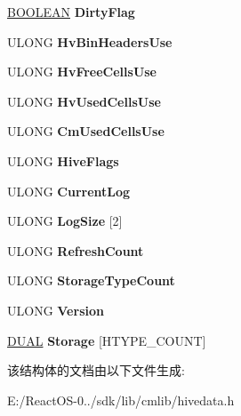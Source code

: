 \begin{DoxyCompactItemize}
\hyperlink{_processor_bind_8h_a112e3146cb38b6ee95e64d85842e380a}{B\+O\+O\+L\+E\+AN} {\bfseries Dirty\+Flag}
\item 
\mbox{\label{struct___h_h_i_v_e_a514c7ef5543f69500f8257a3f31eeb4e}} 
U\+L\+O\+NG {\bfseries Hv\+Bin\+Headers\+Use}
\item 
\mbox{\label{struct___h_h_i_v_e_ad76bb1b3a4222a3390394b26af08b2af}} 
U\+L\+O\+NG {\bfseries Hv\+Free\+Cells\+Use}
\item 
\mbox{\label{struct___h_h_i_v_e_a3e62fe4b991411ff4d2c532f8ceb3fd0}} 
U\+L\+O\+NG {\bfseries Hv\+Used\+Cells\+Use}
\item 
\mbox{\label{struct___h_h_i_v_e_ab1800ec63969efc7a480febd4ca7c5d5}} 
U\+L\+O\+NG {\bfseries Cm\+Used\+Cells\+Use}
\item 
\mbox{\label{struct___h_h_i_v_e_a421c976cf4d564fc1048977d1d959276}} 
U\+L\+O\+NG {\bfseries Hive\+Flags}
\item 
\mbox{\label{struct___h_h_i_v_e_a079b7a74ce7c10919aedf298c47fdb38}} 
U\+L\+O\+NG {\bfseries Current\+Log}
\item 
\mbox{\label{struct___h_h_i_v_e_a97395ca8ecc59f663075777efb1c75ac}} 
U\+L\+O\+NG {\bfseries Log\+Size} \mbox{[}2\mbox{]}
\item 
\mbox{\label{struct___h_h_i_v_e_a918d82473ba2b6591f1c4b085cc9c082}} 
U\+L\+O\+NG {\bfseries Refresh\+Count}
\item 
\mbox{\label{struct___h_h_i_v_e_ace4671252723dbe9a965071b607184c5}} 
U\+L\+O\+NG {\bfseries Storage\+Type\+Count}
\item 
\mbox{\label{struct___h_h_i_v_e_ab8f6e7f0a155a6cb546ed40942a6455f}} 
U\+L\+O\+NG {\bfseries Version}
\item 
\mbox{\label{struct___h_h_i_v_e_ab17686c5ec3b05f1e405a698c0a64c84}} 
\hyperlink{struct___d_u_a_l}{D\+U\+AL} {\bfseries Storage} \mbox{[}H\+T\+Y\+P\+E\+\_\+\+C\+O\+U\+NT\mbox{]}
\end{DoxyCompactItemize}


该结构体的文档由以下文件生成\+:\begin{DoxyCompactItemize}
\item 
E\+:/\+React\+O\+S-\/0../sdk/lib/cmlib/hivedata.\+h\end{DoxyCompactItemize}
